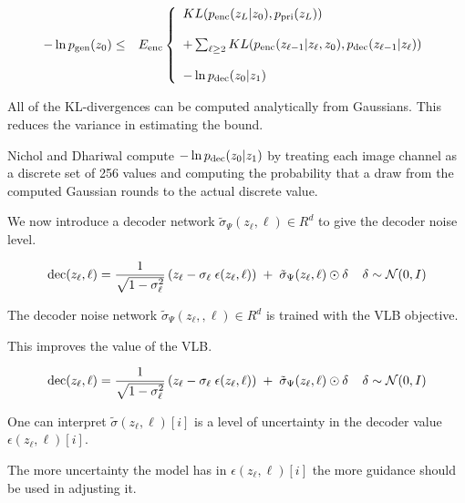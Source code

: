 {

{\huge
  \begin{eqnarray*}
    - \ln p_{\mathrm{gen}}(z_0) & \leq & E_{\mathrm{enc}} \left\{\begin{array}{l}KL(p_{\mathrm{enc}}(z_L|z_0),p_{\mathrm{pri}}(z_L)) \\
\\
+ \sum_{\ell \geq 2} KL(p_{\mathrm{enc}}(z_{\ell-1}|z_\ell,z_0),p_{\mathrm{dec}}(z_{\ell-1}|z_\ell)) \\
\\
- \ln p_{\mathrm{dec}}(z_0|z_1) \end{array} \right.
\end{eqnarray*}
}

All of the KL-divergences can be computed analytically from Gaussians.  This reduces the variance in estimating the bound.

\vfill
Nichol and Dhariwal compute $- \ln p_{\mathrm{dec}}(z_0|z_1)$ by treating each image channel as a discrete set of 256 values and computing the probability that a draw from
the computed Gaussian rounds to the actual discrete value.


We now introduce a decoder network $\tilde{\sigma}_\Psi(z_\ell,\ell) \in R^d$ to give the decoder noise level.

\vfill
$$\mathrm{dec}(z_\ell,\ell) = \frac{1}{\sqrt{1-\sigma_\ell^2}}\left(z_\ell - \sigma_\ell\; \epsilon(z_\ell,\ell)\right)\; +\; \tilde{\sigma}_\Psi(z_\ell,\ell)\odot\delta\;\;\;\;\delta \sim {\cal N}(0,I)$$

\vfill
The decoder noise network $\tilde{\sigma}_\Psi(z_\ell,,\ell) \in R^d$ is trained with the VLB objective.

\vfill
This improves the value of the VLB.


$$\mathrm{dec}(z_\ell,\ell) = \frac{1}{\sqrt{1-\sigma_\ell^2}}\left(z_\ell - \sigma_\ell\; \epsilon(z_\ell,\ell)\right)\; +\; \tilde{\sigma}_\Psi(z_\ell,\ell)\odot\delta\;\;\;\;\delta \sim {\cal N}(0,I)$$

\vfill
One can interpret $\tilde{\sigma}(z_\ell,\ell)[i]$ is a level of uncertainty in the decoder value $\epsilon(z_\ell,\ell)[i]$.

\vfill
The more uncertainty the model has in $\epsilon(z_\ell,\ell)[i]$ the more guidance should be used in adjusting it.



}
